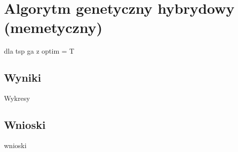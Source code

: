 \section{Algorytm genetyczny hybrydowy (memetyczny)}


dla tsp ga z optim = T




\subsection{Wyniki}

Wykresy

\subsection{Wnioski}

wnioski
